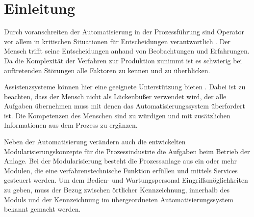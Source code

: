 
\chapter{Einleitung}
\label{sec:Einleitung}

Durch voranschreiten der Automatisierung in der Prozessführung sind Operator vor allem in kritischen Situationen für Entscheidungen verantwortlich \cite{Bainbridge1983}. Der Mensch trifft seine Entscheidungen anhand von Beobachtungen und Erfahrungen. Da die Komplexität der Verfahren zur Produktion zunimmt ist es schwierig bei auftretenden Störungen alle Faktoren zu kennen und zu überblicken. 

Assistenzsysteme können hier eine geeignete Unterstützung bieten \cite{Dalgleish2007} . Dabei ist zu beachten, dass der Mensch nicht als Lückenbüßer verwendet wird, der alle Aufgaben übernehmen muss mit denen das Automatisierungssystem überfordert ist. Die Kompetenzen des Menschen sind zu würdigen und mit zusätzlichen Informationen aus dem Prozess zu ergänzen. \cite{Weisner2018}

Neben der Automatisierung verändern auch die entwickelten Modularisierungskonzepte für die Prozessindustrie die Aufgaben beim Betrieb der Anlage. Bei der Modularisierung besteht die Prozessanlage aus ein oder mehr Modulen, die eine verfahrenstechnische Funktion erfüllen und mittels Services gesteuert werden. \glqq Um dem Bedien- und Wartungspersonal Eingriffsmöglichkeiten zu geben, muss der Bezug zwischen örtlicher Kennzeichnung, innerhalb des Moduls und der Kennzeichnung im übergeordneten Automatisierungssystem bekannt gemacht werden.\grqq \ \cite{Obst2013} 



